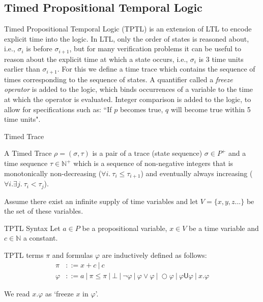 \documentclass[a4paper]{article}
\newcommand{\U}{\mathsf{U}}
\begin{document}
\subsection{Timed Propositional Temporal Logic}
Timed Propositional Temporal Logic (TPTL)\autocite{alur1994really} is an extension of LTL to encode explicit time into the logic. In LTL, only the order of states is reasoned about, i.e., $\sigma_i$ is before $\sigma_{i+1}$, but for many verification problems it can be useful to reason about the explicit time at which a state occurs, i.e., $\sigma_i$ is 3 time units earlier than $\sigma_{i+1}$. For this we define a time trace which contains the sequence of times corresponding to the sequence of states. A quantifier called a \emph{freeze operator} is added to the logic, which binds occurrences of a variable to the time at which the operator is evaluated. Integer comparison is added to the logic, to allow for specifications such as: ``If $p$ becomes true, $q$ will become true within 5 time units".



\begin{defn}{Timed Trace}

  A Timed Trace $\rho = (\sigma,\tau)$ is a pair of a trace (state sequence) $\sigma \in P^+$ and a time sequence $\tau \in \mathbb{N}^+$ which is a sequence of non-negative integers that is monotonically non-decreasing ($\forall i. ~\tau_i \leq \tau_{i+1}$) and eventually always increasing ($\forall i. \exists j. ~\tau_i < \tau_j$).
\end{defn}

Assume there exist an infinite supply of time variables  and let $V=\{x,y,z...\}$ be the set of these variables.

\begin{defn}{TPTL Syntax}\label{tptlsyn}
  Let $a\in P$ be a propositional variable, $x\in V$ be a time variable and $c\in\mathbb{N}$ a constant.

  TPTL terms $\pi$ and formulas $\varphi$ are inductively defined as follows:
  \begin{align*}
    \pi &::= x + c ~|~ c\\
    \varphi &::= a ~|~ \pi \leq \pi ~|~ \bot ~|~ \neg \varphi ~|~\varphi \lor \varphi ~|~ \bigcirc \varphi ~|~ \varphi \U \varphi ~|~ x. \varphi
  \end{align*}
\end{defn}

We read $x. \varphi$ as `freeze $x$ in $\varphi$'.
\end{document}
